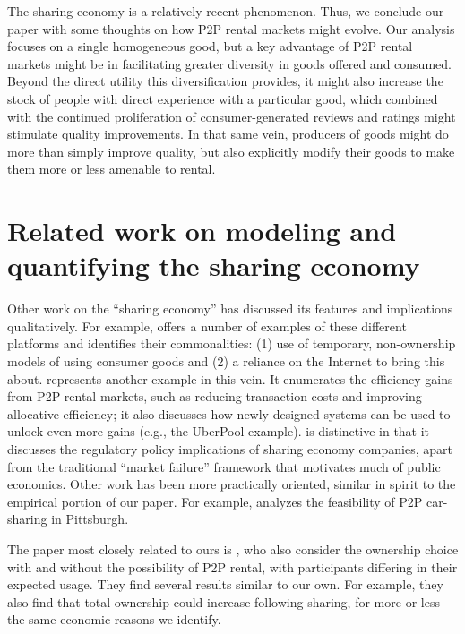 \documentclass[11pt]{article}
\begin{document}
The sharing economy is a relatively recent phenomenon.
Thus, we conclude our paper with some thoughts on how P2P rental markets might evolve.
Our analysis focuses on a single homogeneous good, but a key advantage of P2P rental markets might be in facilitating greater diversity in goods offered and consumed. 
Beyond the direct utility this diversification provides, it might also increase the stock of people with direct experience with a particular good, which combined with the continued proliferation of consumer-generated reviews and ratings might stimulate quality improvements. 
In that same vein, producers of goods might do more than simply improve quality, but also explicitly modify their goods to make them more or less amenable to rental.

\section{Related work on modeling and quantifying the sharing economy}

Other work on the ``sharing economy'' has discussed its features and implications qualitatively. 
For example, \cite{belk2014you} offers a number of examples of these different platforms and identifies their commonalities: (1) use of temporary, non-ownership models of using consumer goods and (2) a reliance on the Internet to bring this about. 
\cite{edelman2015efficiencies} represents another example in this vein.
It enumerates the efficiency gains from P2P rental markets, such as reducing transaction costs and improving allocative efficiency;
it also discusses how newly designed systems can be used to unlock even more gains (e.g., the UberPool example). 
\citeauthor{edelman2015efficiencies} is distinctive in that it discusses the regulatory policy implications of sharing economy companies, apart from the traditional ``market failure'' framework that motivates much of public economics.  
Other work has been more practically oriented, similar in spirit to the empirical portion of our paper.
For example, \cite{hampshire2011peer} analyzes the feasibility of P2P car-sharing in Pittsburgh.

The paper most closely related to ours is \cite{benjaafar2015peer},
who also consider the ownership choice with and without the possibility of P2P rental, with participants differing in their expected usage. 
They find several results similar to our own.
For example, they also find that total ownership could increase following sharing, for more or less the same economic reasons we identify.
\end{document}
